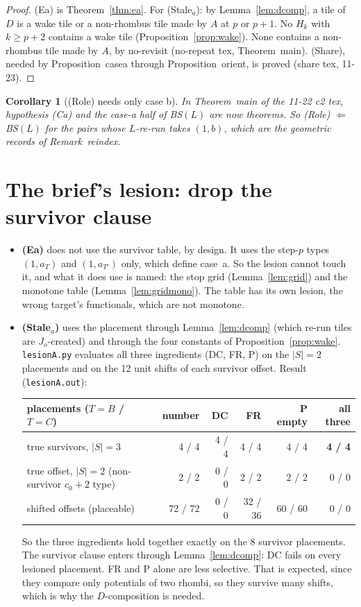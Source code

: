 \documentclass[11pt]{article}
\newtheorem{corollary}[theorem]{Corollary}
\theoremstyle{definition}\newtheorem{definition}[theorem]{Definition}\newtheorem{remark}[theorem]{Remark}
\begin{document}
\begin{proof}
(Ea) is Theorem~\ref{thm:ea}. For (Stale$_a$): by Lemma~\ref{lem:dcomp}, a tile of $D$ is a wake tile or a non-rhombus tile made by $A$ at $p$ or $p+1$. No $H_k$ with $k\ge p+2$ contains a wake tile (Proposition~\ref{prop:wake}). None contains a non-rhombus tile made by $A$, by no-revisit (no-repeat tex, Theorem~main). (Share), needed by Proposition~casea through Proposition~orient, is proved (share tex, 11-23).
\end{proof}

\begin{corollary}[(Role) needs only case b]\label{cor:role}
In Theorem~main of the 11-22 c2 tex, hypothesis (Ca) and the case-a half of BS$(L)$ are now theorems. So \textup{(Role)} $\Leftarrow$ \textup{BS}$(L)$ for the pairs whose $L$-re-run takes $(1,b)$, which are the geometric records of Remark~reindex.
\end{corollary}

\section{The brief's lesion: drop the survivor clause}\label{sec:lesion}
\begin{itemize}
\item \textbf{(Ea)} does not use the survivor table, by design. It uses the step-$p$ types $(1,a_T)$ and $(1,a_{T'})$ only, which define case~a. So the lesion cannot touch it, and what it does use is named: the stop grid (Lemma~\ref{lem:grid}) and the monotone table (Lemma~\ref{lem:gridmono}). The table has its own lesion, the wrong target's functionals, which are not monotone.
\item \textbf{(Stale$_a$)} uses the placement through Lemma~\ref{lem:dcomp} (which re-run tiles are $J_o$-created) and through the four constants of Proposition~\ref{prop:wake}. \texttt{lesionA.py} evaluates all three ingredients (DC, FR, P) on the $|S|=2$ placements and on the 12 unit shifts of each survivor offset. Result (\texttt{lesionA.out}):
\begin{center}\small\begin{tabular}{lrrrrr}\toprule
placements ($T=B$ / $T=C$) & number & DC & FR & P empty & all three\\\midrule
true survivors, $|S|=3$ & 4 / 4 & 4 / 4 & 4 / 4 & 4 / 4 & \textbf{4 / 4}\\
true offset, $|S|=2$ (non-survivor $c_0+2$ type) & 2 / 2 & 0 / 0 & 2 / 2 & 2 / 2 & 0 / 0\\
shifted offsets (placeable) & 72 / 72 & 0 / 0 & 32 / 36 & 60 / 60 & 0 / 0\\\bottomrule
\end{tabular}\end{center}
So the three ingredients hold together exactly on the 8 survivor placements. The survivor clause enters through Lemma~\ref{lem:dcomp}: DC fails on every lesioned placement. FR and P alone are less selective. That is expected, since they compare only potentials of two rhombi, so they survive many shifts, which is why the $D$-composition is needed.
\end{itemize}
\end{document}
